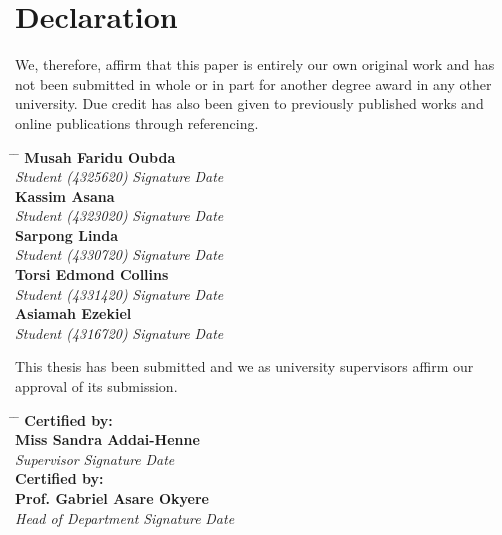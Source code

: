 \documentclass[doublespacing]{report} [12px]%
\begin{document}
\chapter*{Declaration}

\vspace{1cm}

We, therefore, affirm that this paper is entirely our own original work and has not been submitted in whole or in part for another degree award in any other university. Due credit has also been given to previously published works and online publications through referencing. 
\vspace{2cm}

\begin{tabbing}
    \hspace{6cm} \= \hspace{4cm} \= \hspace{5cm} \kill
    \textbf{Musah Faridu Oubda} \> \makebox[4cm]{\dotfill} \> \makebox[4cm]{\dotfill} \\
    \textit{Student (4325620)} \> \textit{Signature} \> \textit{Date} \\[1.5cm]
    \textbf{Kassim Asana} \> \makebox[3cm]{\dotfill} \> \makebox[3cm]{\dotfill} \\
    \textit{Student (4323020)} \> \textit{Signature} \> \textit{Date} \\[1.5cm]
    \textbf{Sarpong Linda} \> \makebox[3cm]{\dotfill} \> \makebox[3cm]{\dotfill} \\
    \textit{Student (4330720)} \> \textit{Signature} \> \textit{Date} \\[1.5cm]
    \textbf{Torsi Edmond Collins} \> \makebox[3cm]{\dotfill} \> \makebox[3cm]{\dotfill} \\
    \textit{Student (4331420)} \> \textit{Signature} \> \textit{Date} \\[1.5cm]
    \textbf{Asiamah Ezekiel} \> \makebox[3cm]{\dotfill} \> \makebox[3cm]{\dotfill} \\
    \textit{Student (4316720)} \> \textit{Signature} \> \textit{Date} \\[1.5cm]
\end{tabbing}
This thesis has been submitted and we as university supervisors affirm our approval of
its submission.\\


\begin{tabbing}
 \hspace{6cm} \= \hspace{4cm} \= \hspace{5cm} \kill
     \textbf{Certified by:}\\ 
    \textbf{Miss Sandra Addai-Henne} \> \makebox[3cm]{\dotfill} \> \makebox[3cm]{\dotfill} \\
    \textit{Supervisor} \> \textit{Signature} \> \textit{Date} \\[1.5cm]
    \textbf{Certified by:}\\ 
\textbf{Prof. Gabriel Asare Okyere } \> \makebox[3cm]{\dotfill} \> \makebox[3cm]{\dotfill} \\
    \textit{Head of Department} \> \textit{Signature} \> \textit{Date}
\end{tabbing}
\end{document}
